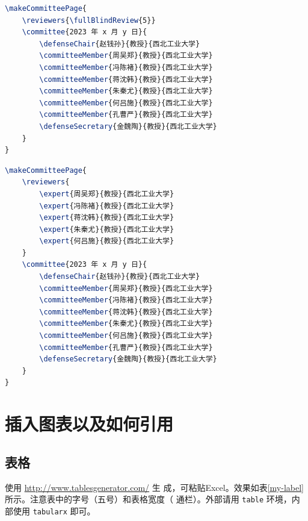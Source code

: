 \documentclass[lang=chs, degree=phd, blindreview=false, winfonts=true]{nputhesis}
\begin{document}
\begin{lstlisting}[language={TeX}, label={code:makeBlindReviewerCommitteePage},
    caption={盲评样例 makeBlindReviewerCommitteePage.tex}]
\makeCommitteePage{
    \reviewers{\fullBlindReview{5}}
    \committee{2023 年 x 月 y 日}{
        \defenseChair{赵钱孙}{教授}{西北工业大学}
        \committeeMember{周吴郑}{教授}{西北工业大学}
        \committeeMember{冯陈褚}{教授}{西北工业大学}
        \committeeMember{蒋沈韩}{教授}{西北工业大学}
        \committeeMember{朱秦尤}{教授}{西北工业大学}
        \committeeMember{何吕施}{教授}{西北工业大学}
        \committeeMember{孔曹严}{教授}{西北工业大学}
        \defenseSecretary{金魏陶}{教授}{西北工业大学}
    }
}
\end{lstlisting}

\begin{lstlisting}[language={TeX}, label={code:makeOpenReviewerCommitteePage},
    caption={明审样例 makeOpenReviewerCommitteePage.tex}]
\makeCommitteePage{
    \reviewers{
        \expert{周吴郑}{教授}{西北工业大学}
        \expert{冯陈褚}{教授}{西北工业大学}
        \expert{蒋沈韩}{教授}{西北工业大学}
        \expert{朱秦尤}{教授}{西北工业大学}
        \expert{何吕施}{教授}{西北工业大学}
    }
    \committee{2023 年 x 月 y 日}{
        \defenseChair{赵钱孙}{教授}{西北工业大学}
        \committeeMember{周吴郑}{教授}{西北工业大学}
        \committeeMember{冯陈褚}{教授}{西北工业大学}
        \committeeMember{蒋沈韩}{教授}{西北工业大学}
        \committeeMember{朱秦尤}{教授}{西北工业大学}
        \committeeMember{何吕施}{教授}{西北工业大学}
        \committeeMember{孔曹严}{教授}{西北工业大学}
        \defenseSecretary{金魏陶}{教授}{西北工业大学}
    }
}
\end{lstlisting}

\cleardoublepage

\chapter{插入图表以及如何引用}

\section{表格}

使用 \href{http://www.tablesgenerator.com/}{http://www.tablesgenerator.com/} 生
成，可粘贴Excel。效果如表\ref{my-label}所示。注意表中的字号（五号）和表格宽度（
通栏）。外部请用 \lstinline`table` 环境，内部使用 \lstinline`tabularx` 即可。
\end{document}
